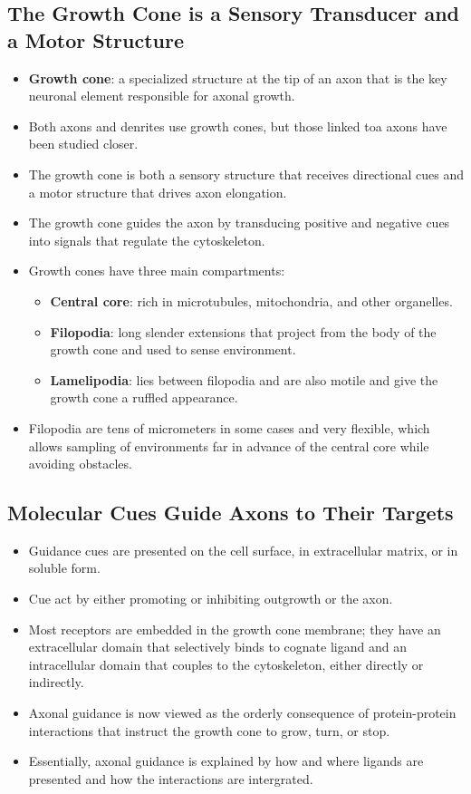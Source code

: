 \documentclass[12pt,a4paper]{article}
\begin{document}
\subsection{The Growth Cone is a Sensory Transducer and a Motor Structure}
\begin{itemize}
    \item \textbf{Growth cone}: a specialized structure at the tip of an axon that is the key neuronal element responsible for axonal growth.
    \item Both axons and denrites use growth cones, but those linked toa axons have been studied closer.
    \item The growth cone is both a sensory structure that receives directional cues and a motor structure that drives axon elongation.
    \item The growth cone guides the axon by transducing positive and negative cues into signals that regulate the cytoskeleton.
    \item Growth cones have three main compartments:
        \begin{itemize}
            \item \textbf{Central core}: rich in microtubules, mitochondria, and other organelles.
            \item \textbf{Filopodia}: long slender extensions that project from the body of the growth cone and used to sense environment.
            \item \textbf{Lamelipodia}: lies between filopodia and are also motile and give the growth cone  a ruffled appearance.
        \end{itemize}
    \item Filopodia are tens of micrometers in some cases and very flexible, which allows sampling of environments far in advance of the central core while avoiding obstacles.
\end{itemize}

\subsection{Molecular Cues Guide Axons to Their Targets}
\begin{itemize}
    \item Guidance cues are presented on the cell surface, in extracellular matrix, or in soluble form.
    \item Cue act by either promoting or inhibiting outgrowth or the axon.
    \item Most receptors are embedded in the growth cone membrane; they have an extracellular domain that selectively binds to cognate ligand and an intracellular domain that couples to the cytoskeleton, either directly or indirectly.
    \item Axonal guidance is now viewed as the orderly consequence of protein-protein interactions that instruct the growth cone to grow, turn, or stop.
    \item Essentially, axonal guidance is explained by how and where ligands are presented and how the interactions are intergrated.
\end{itemize}
\end{document}
